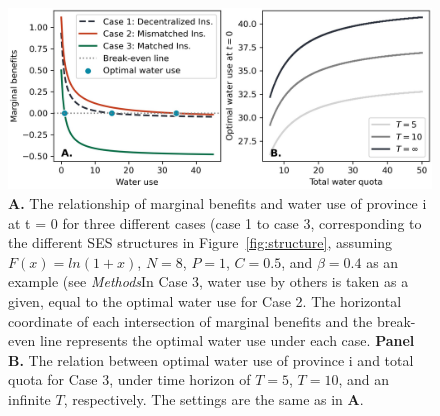 \documentclass{article}
\begin{document}
\begin{table}[!ht]
	\centering
	\caption{Summary of marginal returns and marginal costs for each case }
	\centering
	\footnotesize{}
	\label{tab:cases}
\end{table}


\begin{figure}[!ht]
    \centering
    \includegraphics[width=12cm]{../../../figs/outputs/economic_model.jpg}
	\caption{
		\textbf{A.} The relationship of marginal benefits and water use of province i at t = 0 for three different cases (case 1 to case 3, corresponding to the different SES structures in Figure~\ref{fig:structure}, assuming $F(x)=ln(1+x)$, $N=8$, $P=1$, $C=0.5$, and $\beta=0.4$ as an example  (see \textit{Methods}In Case 3, water use by others is taken as a given, equal to the optimal water use for Case 2. The horizontal coordinate of each intersection of marginal benefits and the break-even line represents the optimal water use under each case.
		\textbf{Panel B.} The relation between optimal water use of province i and total quota for Case 3, under time horizon of $T=5$, $T=10$, and an infinite $T$, respectively. The settings are the same as in \textbf{A}.
	}
	\label{fig:economic_model}
\end{figure}
\end{document}

